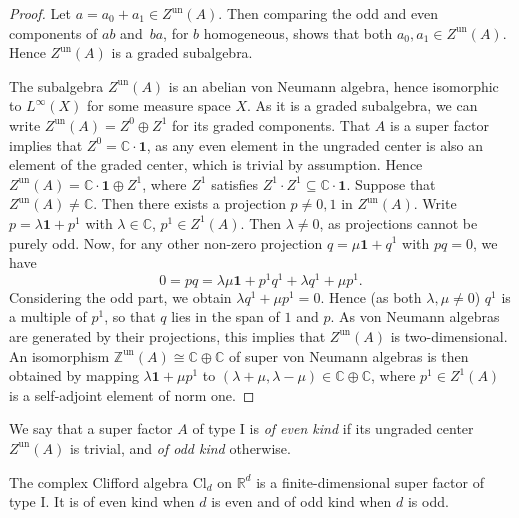 \documentclass[pdftex]{sigma}
\numberwithin{equation}{section}
\newcommand{\R}{\mathbb{R}}
\newcommand{\Z}{\mathbb{Z}}
\newcommand{\C}{\mathbb{C}}
\newcommand{\Cl}{\mathrm{Cl}}
\begin{document}
\begin{proof}
Let $a = a_0 + a_1 \in Z^{\mathrm{un}}(A)$.
Then comparing the odd and even components of $ab$ and~$ba$, for $b$ homogeneous, shows that both $a_0, a_1 \in Z^{\mathrm{un}}(A)$.
Hence $Z^{\mathrm{un}}(A)$ is a graded subalgebra.

The subalgebra $Z^{\mathrm{un}}(A)$ is an abelian von Neumann algebra, hence isomorphic to $L^\infty(X)$ for some measure space $X$.
As it is a graded subalgebra, we can write $Z^{\mathrm{un}}(A) = Z^0 \oplus Z^1$ for its graded components.
That $A$ is a super factor implies that $Z^0 = \C \cdot \mathbf{1}$, as any even element in the ungraded center is also an element of the graded center, which is trivial by assumption.
Hence $Z^{\mathrm{un}}(A) = \C\cdot \mathbf{1} \oplus Z^1$, where $Z^1$ satisfies $Z^1 \cdot Z^1 \subseteq \C\cdot \mathbf{1}$.
Suppose that $Z^{\mathrm{un}}(A) \neq \C$.
Then there exists a projection $p \neq 0, 1$ in $Z^{\mathrm{un}}(A)$.
Write $p = \lambda \mathbf{1} + p^1$ with $\lambda \in \C$, $p^1 \in Z^1(A)$.
Then $\lambda \neq 0$, as projections cannot be purely odd.
Now, for any other non-zero projection $q = \mu \mathbf{1} + q^1$ with $pq = 0$, we have
\begin{equation*}
 0 = pq = \lambda \mu \mathbf{1} + p^1q^1 + \lambda q^1 + \mu p^1.
\end{equation*}
Considering the odd part, we obtain $\lambda q^1 + \mu p^1 = 0$.
Hence (as both $\lambda, \mu \neq 0$) $q^1$ is a multiple of $p^1$, so that $q$ lies in the span of $1$ and $p$.
As von Neumann algebras are generated by their projections, this implies that $Z^{\mathrm{un}}(A)$ is two-dimensional.
An isomorphism $\Z^{\mathrm{un}}(A) \cong \C \oplus \C$ of super von Neumann algebras is then obtained by mapping $\lambda \mathbf{1} + \mu p^1$ to $(\lambda + \mu, \lambda - \mu) \in \C \oplus\C$, where $p^1 \in Z^1(A)$ is a self-adjoint element of norm one.
\end{proof}

\begin{Definition}
We say that a super factor $A$ of type I is \emph{of even kind} if its ungraded center $Z^{\mathrm{un}}(A)$ is trivial, and \emph{of odd kind} otherwise.	
\end{Definition}

\begin{Example} \label{ExampleFiniteDimensional}
 The complex Clifford algebra $\Cl_d$ on $\R^d$ is a finite-dimensional super factor of type I.
 It is of even kind when $d$ is even and of odd kind when $d$ is odd.
\end{Example}
\end{document}
